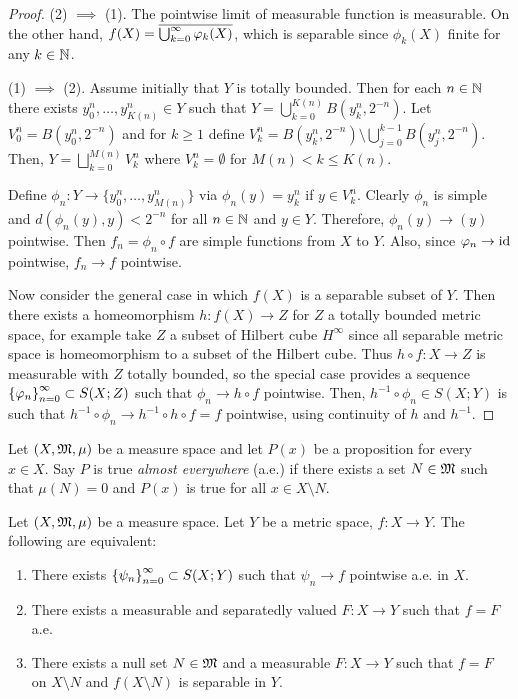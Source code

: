 \documentclass[a4paper]{article}
\begin{document}
\begin{proof}

(2) $\implies$ (1). The pointwise limit of measurable function 
is measurable. On the other hand, $f(X) = \overline{\bigcup_{k=0}^\infty \varphi_k(X)}$,
which is separable since $\phi_k(X)$ finite for any $k \in \mathbb{N}$.

(1) $\implies$ (2). Assume initially that $Y$ is totally bounded.
Then for each $n \in \mathbb{N}$ there exists $y^n_0, \dots, y^n_{K(n)} \in Y$
such that $Y = \bigcup_{k=0}^{K(n)} B(y^n_k, 2^{-n})$. 
Let $V^n_0 = B(y_0^n, 2^{-n})$ and for $k \geq 1$ define
$V^n_k = B(y^n_k, 2^{-n}) \setminus \bigcup_{j=0}^{k-1} 
B(y^n_j, 2^{-n})$. Then, $Y = \bigsqcup_{k=0}^{M(n)} V_k^n$
where $V^n_k = \emptyset$ for $M(n) < k \leq K(n)$.

Define $\phi_n: Y \to \{ y_0^n, \dots, y_{M(n)}^n \}$
via $\phi_n(y) = y_k^n$ if $y \in V_k^n$. Clearly $\phi_n$
is simple and $d(\phi_n(y), y) < 2^{-n}$ for all $n \in \mathbb{N}$
and $y \in Y$. Therefore, $\phi_n(y) \to (y)$ pointwise.
Then $f_n = \phi_n \circ f$ are simple functions
from $X$ to $Y$. Also, since $\varphi_n \to \operatorname{id}$ pointwise, 
$f_n \to f$ pointwise.

Now consider the general case in which $f(X)$ is a separable
subset of $Y$. Then there exists a homeomorphism $h: f(X) 
\to Z$ for $Z$ a totally bounded metric space, for example
take $Z$ a subset of Hilbert cube $H^\infty$ since 
all separable metric space is homeomorphism to a subset of 
the Hilbert cube. Thus $h \circ f: X \to Z$ is measurable
with $Z$ totally bounded, so the special case provides 
a sequence $\left\{ \varphi_n \right\}_{n=0}^\infty \subset S(X; Z)$ such that 
$\phi_n \to h \circ f$ pointwise. Then, 
$h^{-1} \circ \phi_n \in S(X; Y)$ is such that 
$h^{-1} \circ \phi_n \to h^{-1} \circ h \circ f = f$
pointwise, using continuity of $h$ and $h^{-1}$.

\end{proof}

\begin{defi}
  
Let $(X, \mathfrak{M}, \mu)$ be a measure space and let 
$P(x)$ be a proposition for every $x \in X$. Say 
$P$ is true \emph{almost everywhere} (a.e.) if there exists 
a set $N \in \mathfrak{M}$ such that $\mu(N) = 0$ and 
$P(x)$ is true for all $x \in X \setminus N$.

\end{defi}

\begin{thm}
  Let $(X, \mathfrak{M}, \mu)$ be a measure space. Let $Y$ be a 
  metric space, $f: X \to Y$. The following are equivalent:
  \begin{enumerate}
    \item There exists $\left\{ \psi_n \right\}_{n=0}^\infty \subset S(X; Y)$
    such that $\psi_n \to f$ pointwise a.e. in $X$.
    \item There exists a measurable and separatedly valued 
    $F : X \to Y$ such that $f = F$ a.e.
    \item There exists a null set $N \in \mathfrak{M}$ and a 
    measurable $F: X \to Y$ such that $f = F$ 
    on $X \setminus N$ and $f(X \setminus N)$ is separable in
    $Y$.
  \end{enumerate}
\end{thm}
\end{document}
